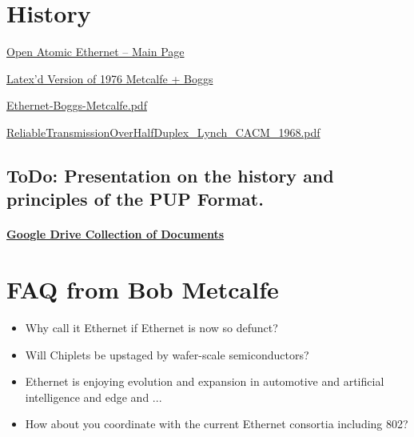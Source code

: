 \documentclass[../HFT-main.tex]{subfiles} %
\begin{document}
\section{History}

\href{https://www.opencompute.org/w/index.php?title=Open_Atomic_Ethernet}{Open Atomic Ethernet -- Main Page}

\href{}{Latex'd Version of 1976 Metcalfe + Boggs}

\href{https://drive.google.com/uc?export=download&id=1KYQNFdG1bCWj53gF5J6nK6LYDHWIsB8g}{Ethernet-Boggs-Metcalfe.pdf}

\href{https://drive.google.com/uc?export=download&id=1zWt4QiibhzpzO8RgrGv2I7RctExlXGxs}{ReliableTransmissionOverHalfDuplex\_Lynch\_CACM\_1968.pdf}


\subsection{ToDo: Presentation on the history and principles of the PUP Format.}

\paragraph{\href{https://drive.google.com/drive/folders/1IYqgrZCpfjWHP0BoHvcC6fHloPj4qwi3}{Google Drive Collection of Documents}}

\section{FAQ from Bob Metcalfe}

\begin{itemize}
	\item Why call it Ethernet if Ethernet is now so defunct?
	\item Will Chiplets be upstaged by wafer-scale semiconductors?
	\item Ethernet is enjoying evolution and expansion in automotive and artificial intelligence and edge and ...
	\item How about you coordinate with the current Ethernet consortia including 802?
\end{itemize}
\end{document}
